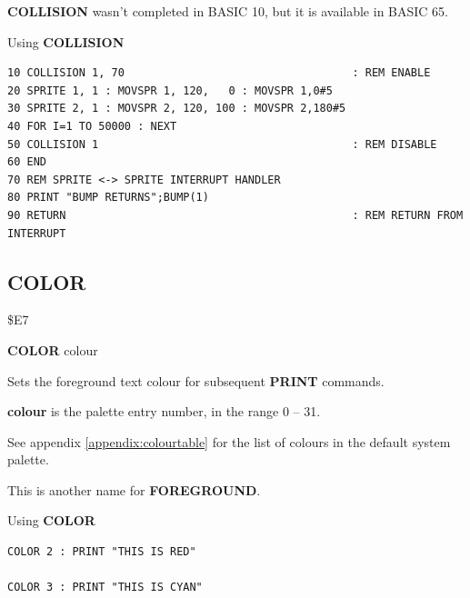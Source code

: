 \begin{description}[leftmargin=2cm,style=nextline]
                 {\bf COLLISION} wasn't completed in BASIC 10, but it is available in BASIC 65.

\item [Example:] Using {\bf COLLISION}

\begin{tcolorbox}[colback=black,coltext=white]
\verbatimfont{\codefont}
\begin{verbatim}
10 COLLISION 1, 70                                   : REM ENABLE
20 SPRITE 1, 1 : MOVSPR 1, 120,   0 : MOVSPR 1,0#5
30 SPRITE 2, 1 : MOVSPR 2, 120, 100 : MOVSPR 2,180#5
40 FOR I=1 TO 50000 : NEXT
50 COLLISION 1                                       : REM DISABLE
60 END
70 REM SPRITE <-> SPRITE INTERRUPT HANDLER
80 PRINT "BUMP RETURNS";BUMP(1)
90 RETURN                                            : REM RETURN FROM INTERRUPT
\end{verbatim}
\end{tcolorbox}
\end{description}


\newpage
\subsection{COLOR}
\begin{description}[leftmargin=2cm,style=nextline]
\item [Token:]   \$E7

\item [Format:]  {\bf COLOR} colour

\item [Usage:]   Sets the foreground text colour for subsequent {\bf PRINT} commands.

                 {\bf colour} is the palette entry number, in the range 0 -- 31.

                 See appendix \vref{appendix:colourtable} for the list of colours in the default system palette.

\item [Remarks:] This is another name for {\bf FOREGROUND}.

\item [Example:] Using {\bf COLOR}

\begin{tcolorbox}[colback=black,coltext=white]
\verbatimfont{\codefont}
\begin{verbatim}
COLOR 2 : PRINT "THIS IS RED"

COLOR 3 : PRINT "THIS IS CYAN"
\end{verbatim}
\end{tcolorbox}
\end{description}

